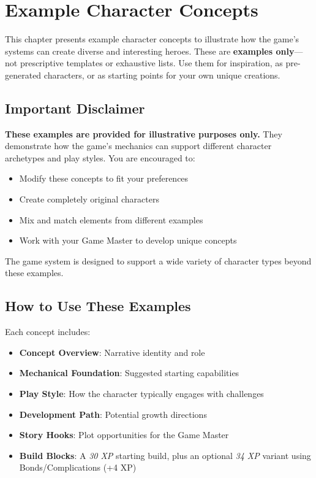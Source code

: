 \chapter{Example Character Concepts}
\label{ch:example-concepts}

This chapter presents example character concepts to illustrate how the game's systems can create diverse and interesting heroes. These are \textbf{examples only}—not prescriptive templates or exhaustive lists. Use them for inspiration, as pre-generated characters, or as starting points for your own unique creations.

\section{Important Disclaimer}

\textbf{These examples are provided for illustrative purposes only.} They demonstrate how the game's mechanics can support different character archetypes and play styles. You are encouraged to:
\begin{itemize}
\item Modify these concepts to fit your preferences
\item Create completely original characters
\item Mix and match elements from different examples
\item Work with your Game Master to develop unique concepts
\end{itemize}

The game system is designed to support a wide variety of character types beyond these examples.

\section{How to Use These Examples}

Each concept includes:
\begin{itemize}
\item \textbf{Concept Overview}: Narrative identity and role
\item \textbf{Mechanical Foundation}: Suggested starting capabilities
\item \textbf{Play Style}: How the character typically engages with challenges
\item \textbf{Development Path}: Potential growth directions
\item \textbf{Story Hooks}: Plot opportunities for the Game Master
\item \textbf{Build Blocks}: A \emph{30 XP} starting build, plus an optional \emph{34 XP} variant using Bonds/Complications (+4 XP)
\end{itemize}

